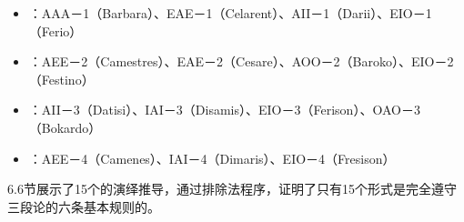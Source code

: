 \begin{itemize}
\item {}：AAA－1（Barbara）、EAE－1（Celarent）、AII－1（Darii）、EIO－1（Ferio）
\item {}：AEE－2（Camestres）、EAE－2（Cesare）、AOO－2（Baroko）、EIO－2（Festino）
\item {}：AII－3（Datisi）、IAI－3（Disamis）、EIO－3（Ferison）、OAO－3（Bokardo）
\item {}：AEE－4（Camenes）、IAI－4（Dimaris）、EIO－4（Fresison）
\end{itemize}

6.6节展示了15个的演绎推导，通过排除法程序，证明了只有15个形式是完全遵守三段论的六条基本规则的。

\begin{center}
\end{center}